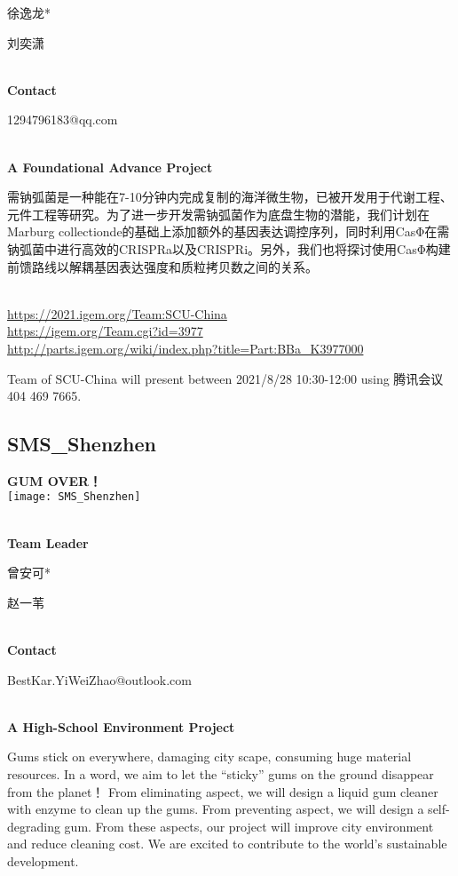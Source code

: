   徐逸龙*

  刘奕潇


\textbf{\\Contact}

  1294796183@qq.com


\textbf{\\A Foundational Advance Project\\}\begin{spacing}{1.5}

需钠弧菌是一种能在7-10分钟内完成复制的海洋微生物，已被开发用于代谢工程、元件工程等研究。为了进一步开发需钠弧菌作为底盘生物的潜能，我们计划在Marburg collectionde的基础上添加额外的基因表达调控序列，同时利用CasΦ在需钠弧菌中进行高效的CRISPRa以及CRISPRi。另外，我们也将探讨使用CasΦ构建前馈路线以解耦基因表达强度和质粒拷贝数之间的关系。\end{spacing}
\\

\url{https://2021.igem.org/Team:SCU-China }\\
\url{https://igem.org/Team.cgi?id=3977 }\\
\url{http://parts.igem.org/wiki/index.php?title=Part:BBa_K3977000 }\\


\vfill{}









Team of SCU-China will present between     2021/8/28 10:30-12:00    using 腾讯会议 404 469 7665.
\newpage


\subsection{\textcolor{Blu}{ SMS\_Shenzhen } }
\vspace{5mm}
\begin{center}
\large{
  \textbf{ GUM OVER！ }\\
  \texttt{[image: SMS\_Shenzhen]}
}
\end{center}
\textbf{\\Team Leader}

  曾安可*

  赵一苇


\textbf{\\Contact}

  BestKar.YiWeiZhao@outlook.com


\textbf{\\A High-School Environment Project\\}\begin{spacing}{1.5}

Gums stick on everywhere, damaging city scape, consuming huge material resources.
In a word, we aim to let the “sticky” gums on the ground disappear from the planet！
From eliminating aspect, we will design a liquid gum cleaner with  enzyme to clean up the gums.
From preventing aspect, we will design a self-degrading gum.
From these aspects, our project will improve city environment and reduce cleaning cost. We are excited to contribute to the world’s sustainable development.\end{spacing}
\\


